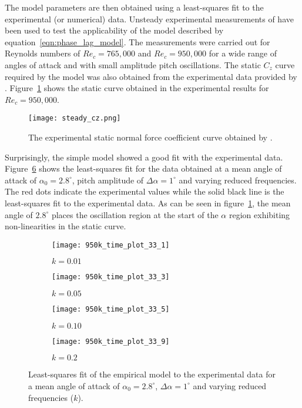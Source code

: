 The model parameters are then obtained using a least-squares fit to the experimental (or numerical) data. Unsteady experimental measurements of \cite{lokattthesis} have been used to test the applicability of the model described by equation~\ref{eqn:phase_lag_model}. The measurements were carried out for Reynolds numbers of $Re_{c}=765,000$ and $Re_{c}=950,000$ for a wide range of angles of attack and with small amplitude pitch oscillations. The static $C_{z}$ curve required by the model was also obtained from the experimental data provided by \cite{lokattthesis}. Figure~\ref{fig:cz_static_exp} shows the static curve obtained in the experimental results for $Re_{c}=950,000$.
\begin{figure}[h]
	\centering
	\texttt{[image: steady\_cz.png]}
	\caption{The experimental static normal force coefficient curve obtained by \cite{lokattthesis}.}
	\label{fig:cz_static_exp}
\end{figure}
Surprisingly, the simple model showed a good fit with the experimental data. Figure~\ref{fig:model_fits1} shows the least-squares fit for the data obtained at a mean angle of attack of $\alpha_{0}=2.8^{\circ}$, pitch amplitude of $\Delta\alpha=1^{\circ}$ and varying reduced frequencies. The red dots indicate the experimental values while the solid black line is the least-squares fit to the experimental data. As can be seen in figure~\ref{fig:cz_static_exp}, the mean angle of $2.8^{\circ}$ places the oscillation region at the start of the $\alpha$ region exhibiting non-linearities in the static curve.
\begin{figure}[h]
	\centering
	\begin{subfigure}[b]{0.45\textwidth}
		\centering
		\texttt{[image: 950k\_time\_plot\_33\_1]}
		\caption{$k=0.01$}
		\label{fig:k_01}
	\end{subfigure}
	\begin{subfigure}[b]{0.45\textwidth}
		\centering
		\texttt{[image: 950k\_time\_plot\_33\_3]}
		\caption{$k=0.05$}
		\label{fig:k_05}
	\end{subfigure}
	\begin{subfigure}[b]{0.45\textwidth}
		\centering
		\texttt{[image: 950k\_time\_plot\_33\_5]}
		\caption{$k=0.10$}
		\label{fig:k_1}
	\end{subfigure}
	\begin{subfigure}[b]{0.45\textwidth}
		\centering
		\texttt{[image: 950k\_time\_plot\_33\_9]}
		\caption{$k=0.2$}
		\label{fig:k_2}
	\end{subfigure}	
	\caption{Least-squares fit of the empirical model to the experimental data for a mean angle of attack of $\alpha_{0}=2.8^{\circ}$, $\Delta\alpha=1^{\circ}$ and varying reduced frequencies ($k$).}
	\label{fig:model_fits1}
\end{figure}
